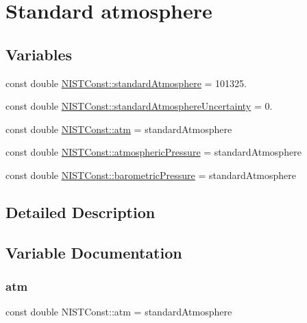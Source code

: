 \hypertarget{group___standard_atmosphere}{}\section{Standard atmosphere}
\label{group___standard_atmosphere}
\subsection*{Variables}
\begin{DoxyCompactItemize}
\item 
const double \hyperlink{group___standard_atmosphere_ga260e00232ff2d0d8a24bdbf7f6c87b4e}{N\+I\+S\+T\+Const\+::standard\+Atmosphere} = 101325.
\item 
const double \hyperlink{group___standard_atmosphere_ga784dc63051d7f1dca50f4f2843c8fbcf}{N\+I\+S\+T\+Const\+::standard\+Atmosphere\+Uncertainty} = 0.
\item 
const double \hyperlink{group___standard_atmosphere_ga93a81873c4680c07e0a212604ce6e106}{N\+I\+S\+T\+Const\+::atm} = standard\+Atmosphere
\item 
const double \hyperlink{group___standard_atmosphere_gab92a3a9d0d82fc926390602e825afea5}{N\+I\+S\+T\+Const\+::atmospheric\+Pressure} = standard\+Atmosphere
\item 
const double \hyperlink{group___standard_atmosphere_ga09e2a2bce1e1f38985f98c22d5a8d43d}{N\+I\+S\+T\+Const\+::barometric\+Pressure} = standard\+Atmosphere
\end{DoxyCompactItemize}


\subsection{Detailed Description}


\subsection{Variable Documentation}
\mbox{\label{group___standard_atmosphere_ga93a81873c4680c07e0a212604ce6e106}} 
\subsubsection{\texorpdfstring{atm}{atm}}
{\footnotesize\ttfamily const double N\+I\+S\+T\+Const\+::atm = standard\+Atmosphere}

